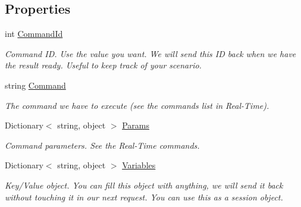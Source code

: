 \subsection*{Properties}
\begin{DoxyCompactItemize}
\item 
int \hyperlink{class_thecallr_api_1_1_objects_1_1_real_time_1_1_real_time_response_a3ae9aaf8c52ce3ab15fdb9e7f3f7175e}{Command\+Id}
\begin{DoxyCompactList}\small\item\em Command I\+D. Use the value you want. We will send this I\+D back when we have the result ready. Useful to keep track of your scenario. \end{DoxyCompactList}\item 
string \hyperlink{class_thecallr_api_1_1_objects_1_1_real_time_1_1_real_time_response_adae0ff55f74c467e335e2487d07dbe86}{Command}
\begin{DoxyCompactList}\small\item\em The command we have to execute (see the commands list in Real-\/\+Time). \end{DoxyCompactList}\item 
Dictionary$<$ string, object $>$ \hyperlink{class_thecallr_api_1_1_objects_1_1_real_time_1_1_real_time_response_ab2b41d0a7a68ec46295b7f1f86ce59fe}{Params}
\begin{DoxyCompactList}\small\item\em Command parameters. See the Real-\/\+Time commands. \end{DoxyCompactList}\item 
Dictionary$<$ string, object $>$ \hyperlink{class_thecallr_api_1_1_objects_1_1_real_time_1_1_real_time_response_ae5b9bace436c3c3e61e9a4cc1bef8ead}{Variables}
\begin{DoxyCompactList}\small\item\em Key/\+Value object. You can fill this object with anything, we will send it back without touching it in our next request. You can use this as a session object. \end{DoxyCompactList}\end{DoxyCompactItemize}


